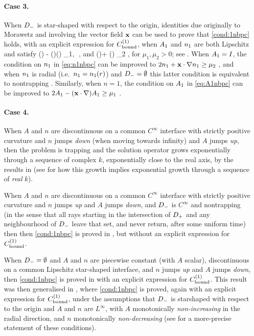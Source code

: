 \paragraph{Case 3.}
When $D_{-}$ is star-shaped with respect to the origin, identities due originally to Morawetz and involving the vector field $\mathbf{x}$ can be used to prove that \cref{cond:1nbpc} holds, with an explicit expression for $C^{(1)}_{\rm bound}$, when $A_{1}$ and $n_{1}$ are both Lipschitz and satisfy
\beq\label{eq:A1nbpc}
\Ao(\bx) - (\bx\cdot\nabla)\Ao(\bx) \geq \mu_1,\,\, \bx\in \Dp,
\eeq
and 
\beq\label{eq:n1nbpc}
\no(\bx)+ \bx\cdot\nabla \no(\bx) \geq \mu_2 \quad{}\bx\in \Dp,
\eeq
for $\mu_1, \mu_2>0$;
see \cite[Theorem 2.5]{GrPeSp:19}. When $A_{1}= I$, the condition on $n_{1}$ in \cref{eq:n1nbpc} can be improved to $2n_{1} + \mathbf{x} \cdot \nabla n_{1} \geq \mu_2$ \cite[Theorem 2.19(ii)]{GrPeSp:19}, and when $n_{1}$ is radial (i.e.~$n_{1}= n_{1}(r)$) and $D_{-}=\emptyset$ this latter condition is equivalent to nontrapping \cite[Theorem 7.7]{GrPeSp:19}.
Similarly, when $n= 1$, the condition on $A_{1}$ in \cref{eq:A1nbpc} can be improved to $2A_{1} - (\mathbf{x}\cdot\nabla)A_{1} \geq \mu_1$
\cite[Theorem 2.19(i)]{GrPeSp:19}.

\paragraph{Case 4.}
When $A$ and $n$ are discontinuous on a common $C^\infty$ interface with strictly positive curvature and $n$ jumps \emph{down} (when moving towards infinity) and $A$ jumps \emph{up}, then the problem is trapping and the solution operator grows exponentially through a sequence of complex $k$, exponentially close to the real axis, by the results in \cite{PoVo:99a} (see \cite[\S6]{MoSp:19} for how this growth implies exponential growth through a sequence of \emph{real} $k$).

When $A$ and $n$ are discontinuous on a common $C^\infty$ interface with strictly positive curvature and $n$ jumps \emph{up} and $A$ jumps \emph{down}, and $D_{-}$ is 
$C^\infty$ and nontrapping (in the sense that all rays starting in the intersection of $D_{+}$ and any neighbourhood of $D_{-}$ leave that set, and never return, after some uniform time) then
then \cref{cond:1nbpc} is proved in \cite{CaPoVo:99}, but without an explicit expression for $C^{(1)}_{\rm bound}$.

When $D_{-}=\emptyset$ and $A$ and $n$ are piecewise constant (with $A$ scalar), discontinuous on a common Lipschitz star-shaped interface, and $n$ jumps \emph{up} and $A$ jumps \emph{down}, then \cref{cond:1nbpc} is proved in \cite{MoSp:19} with an explicit expression for $C^{(1)}_{\rm bound}$. 
This result was then generalised in \cite[Theorem 2.7]{GrPeSp:19}, where 
\cref{cond:1nbpc} is proved, again with an explicit expression for $C^{(1)}_{\rm bound}$, under the assumptions that $D_{-}$ is starshaped with respect to the origin and $A$ and $n$ are $L^\infty$, with $A$ monotonically \emph{non-increasing} in the radial direction, and $n$ monotonically \emph{non-decreasing} (see \cite[Condition 2.6]{GrPeSp:19} for a more-precise statement of these conditions).


